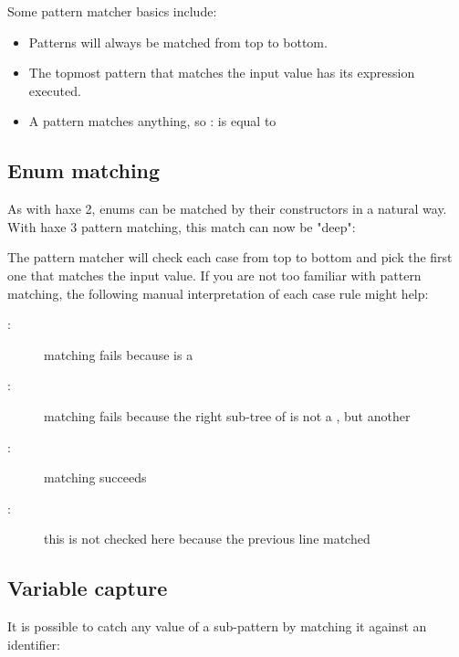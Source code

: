 \documentclass{haxe}
\begin{document}

Some pattern matcher basics include:

\begin{itemize}
	\item Patterns will always be matched from top to bottom.
	\item The topmost pattern that matches the input value has its expression executed.
	\item A \expr{_} pattern matches anything, so : is equal to 
\end{itemize}

\subsection{Enum matching}
\label{lf-pattern-matching-enums}

As with haxe 2, enums can be matched by their constructors in a natural way. With haxe 3 pattern matching, this match can now be "deep":


The pattern matcher will check each case from top to bottom and pick the first one that matches the input value. If you are not too familiar with pattern matching, the following manual interpretation of each case rule might help:

\begin{description}
	\item[:] matching fails because  is a 
	\item[:] matching fails because the right sub-tree of  is not a , but another 
	\item[:] matching succeeds
	\item[:] this is not checked here because the previous line matched
\end{description}

\subsection{Variable capture}
\label{lf-pattern-matching-variable-capture}

It is possible to catch any value of a sub-pattern by matching it against an identifier:

\end{document}
